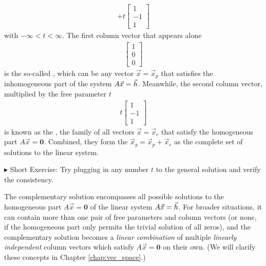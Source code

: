 \begin{solution}
\begin{align*}
+ t
\begin{bmatrix}
1 \\
-1 \\
1
\end{bmatrix}
\end{align*}
with $-\infty < t < \infty$. The first column vector that appears alone
\begin{align*}
\begin{bmatrix}
1 \\
0 \\
0
\end{bmatrix}    
\end{align*}
is the so-called , which can be any vector $\vec{x} = \vec{x}_p$ that satisfies the inhomogeneous part of the system $A\vec{x} = \smash{\vec{h}}$. Meanwhile, the second column vector, multiplied by the free parameter $t$
\begin{align*}
t
\begin{bmatrix}
1 \\
-1 \\
1
\end{bmatrix}    
\end{align*}
is known as the , the family of all vectors $\vec{x} = \vec{x}_c$ that satisfy the homogeneous part $A\vec{x} = \textbf{0}$. Combined, they form the  $\vec{x}_g = \vec{x}_p + \vec{x}_c$ as the complete set of solutions to the linear system. 
\end{solution}
$\blacktriangleright$ Short Exercise: Try plugging in any number $t$ to the general solution and verify the consistency.\footnotemark\par
The complementary solution encompasses all possible solutions to the homogeneous part $A\vec{x} = \textbf{0}$ of the linear system $A\vec{x} = \smash{\vec{h}}$. For broader situations, it can contain more than one pair of free parameters and column vectors (or none, if the homogeneous part only permits the trivial solution of all zeros), and the complementary solution becomes a \textit{linear combination} of multiple \textit{linearly independent} column vectors which satisfy $A\vec{x} = \textbf{0}$ on their own. (We will clarify these concepts in Chapter \ref{chap:vec_space}.)\par
